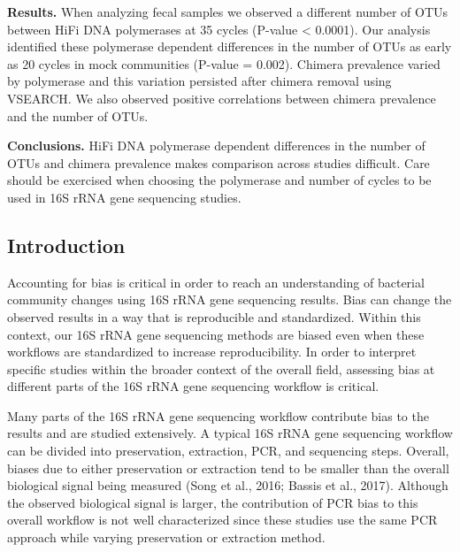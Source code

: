 \documentclass[12pt,]{article}
\begin{document}
\textbf{Results.} When analyzing fecal samples we observed a different
number of OTUs between HiFi DNA polymerases at 35 cycles (P-value
\textless{} 0.0001). Our analysis identified these polymerase dependent
differences in the number of OTUs as early as 20 cycles in mock
communities (P-value = 0.002). Chimera prevalence varied by polymerase
and this variation persisted after chimera removal using VSEARCH. We
also observed positive correlations between chimera prevalence and the
number of OTUs.

\textbf{Conclusions.} HiFi DNA polymerase dependent differences in the
number of OTUs and chimera prevalence makes comparison across studies
difficult. Care should be exercised when choosing the polymerase and
number of cycles to be used in 16S rRNA gene sequencing studies.

\newpage

\subsection{Introduction}\label{introduction}

Accounting for bias is critical in order to reach an understanding of
bacterial community changes using 16S rRNA gene sequencing results. Bias
can change the observed results in a way that is reproducible and
standardized. Within this context, our 16S rRNA gene sequencing methods
are biased even when these workflows are standardized to increase
reproducibility. In order to interpret specific studies within the
broader context of the overall field, assessing bias at different parts
of the 16S rRNA gene sequencing workflow is critical.

Many parts of the 16S rRNA gene sequencing workflow contribute bias to
the results and are studied extensively. A typical 16S rRNA gene
sequencing workflow can be divided into preservation, extraction, PCR,
and sequencing steps. Overall, biases due to either preservation or
extraction tend to be smaller than the overall biological signal being
measured (Song et al., 2016; Bassis et al., 2017). Although the observed
biological signal is larger, the contribution of PCR bias to this
overall workflow is not well characterized since these studies use the
same PCR approach while varying preservation or extraction method.
\end{document}
